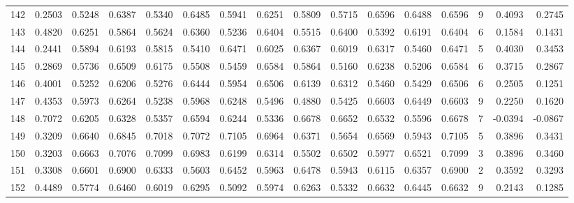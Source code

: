 \begin{tabular}{lrrrrrrrrrrrrrrr}
142 &      0.2503 &  0.5248 &  0.6387 &  0.5340 &  0.6485 &  0.5941 &  0.6251 &  0.5809 &  0.5715 &  0.6596 &   0.6488 &     0.6596 &      9 &                    0.4093 &                     0.2745 \\
143 &      0.4820 &  0.6251 &  0.5864 &  0.5624 &  0.6360 &  0.5236 &  0.6404 &  0.5515 &  0.6400 &  0.5392 &   0.6191 &     0.6404 &      6 &                    0.1584 &                     0.1431 \\
144 &      0.2441 &  0.5894 &  0.6193 &  0.5815 &  0.5410 &  0.6471 &  0.6025 &  0.6367 &  0.6019 &  0.6317 &   0.5460 &     0.6471 &      5 &                    0.4030 &                     0.3453 \\
145 &      0.2869 &  0.5736 &  0.6509 &  0.6175 &  0.5508 &  0.5459 &  0.6584 &  0.5864 &  0.5160 &  0.6238 &   0.5206 &     0.6584 &      6 &                    0.3715 &                     0.2867 \\
146 &      0.4001 &  0.5252 &  0.6206 &  0.5276 &  0.6444 &  0.5954 &  0.6506 &  0.6139 &  0.6312 &  0.5460 &   0.5429 &     0.6506 &      6 &                    0.2505 &                     0.1251 \\
147 &      0.4353 &  0.5973 &  0.6264 &  0.5238 &  0.5968 &  0.6248 &  0.5496 &  0.4880 &  0.5425 &  0.6603 &   0.6449 &     0.6603 &      9 &                    0.2250 &                     0.1620 \\
148 &      0.7072 &  0.6205 &  0.6328 &  0.5357 &  0.6594 &  0.6244 &  0.5336 &  0.6678 &  0.6652 &  0.6532 &   0.5596 &     0.6678 &      7 &                   -0.0394 &                    -0.0867 \\
149 &      0.3209 &  0.6640 &  0.6845 &  0.7018 &  0.7072 &  0.7105 &  0.6964 &  0.6371 &  0.5654 &  0.6569 &   0.5943 &     0.7105 &      5 &                    0.3896 &                     0.3431 \\
150 &      0.3203 &  0.6663 &  0.7076 &  0.7099 &  0.6983 &  0.6199 &  0.6314 &  0.5502 &  0.6502 &  0.5977 &   0.6521 &     0.7099 &      3 &                    0.3896 &                     0.3460 \\
151 &      0.3308 &  0.6601 &  0.6900 &  0.6333 &  0.5603 &  0.6452 &  0.5963 &  0.6478 &  0.5943 &  0.6115 &   0.6357 &     0.6900 &      2 &                    0.3592 &                     0.3293 \\
152 &      0.4489 &  0.5774 &  0.6460 &  0.6019 &  0.6295 &  0.5092 &  0.5974 &  0.6263 &  0.5332 &  0.6632 &   0.6445 &     0.6632 &      9 &                    0.2143 &                     0.1285 \\

\end{tabular}
